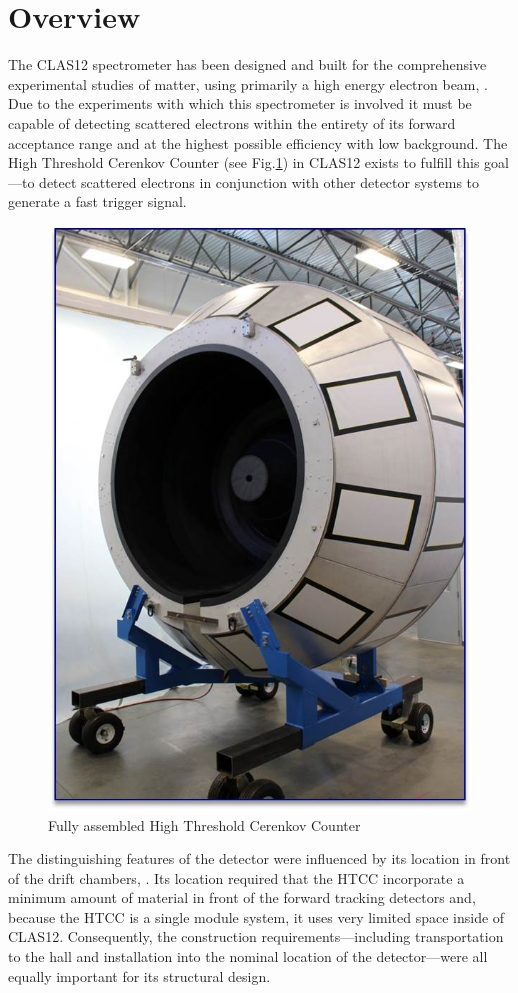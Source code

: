 \section{Overview}

The CLAS12 spectrometer has been designed and built for the comprehensive experimental studies of matter, using primarily a high energy electron beam, \cite{youris}. Due to the experiments with which this spectrometer is involved it must be capable of detecting scattered electrons within the entirety of its forward acceptance range and at the highest possible efficiency with low background. The High Threshold Cerenkov Counter (see Fig.\ref{fig:Picture1}) in CLAS12 exists to fulfill this goal---to detect scattered electrons in conjunction with other detector systems to generate a fast trigger signal. 

\begin{figure}[ht]
    \centering
    \includegraphics[width=0.75\linewidth]{images/Picture1.jpg}
    \caption{Fully assembled High Threshold Cerenkov Counter}
    \label{fig:Picture1}
\end{figure}
The distinguishing features of the detector were influenced by its location in front of the drift chambers, \cite{youris}.  Its location required that the HTCC incorporate a minimum amount of material in front of the forward tracking detectors and, because the HTCC is a single module system, it uses very limited space inside of CLAS12. Consequently, the construction requirements---including transportation to the hall and installation into the nominal location of the detector---were all equally important for its structural design. 






